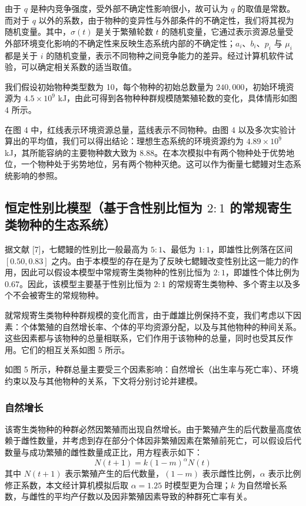 \documentclass[11pt,a4paper]{ctexart}
\begin{document}
由于 $q$ 是种内竞争强度，受外部不确定性影响很小，故可认为 $q$ 的取值是常数。而对于 $q$ 以外的系数，由于物种的变异性与外部条件的不确定性，我们将其视为随机变量。其中，$\sigma(t)$ 是关于繁殖轮数 $t$ 的随机变量，它通过表示资源总量受外部环境变化影响的不确定性来反映生态系统内部的不确定性；$a_{i}$、$b_{i}$、$p_{i}$ 与 $\mu_{i}$ 都是关于 $i$ 的随机变量，表示不同物种之间竞争能力的差异。经过计算机软件试验，可以确定相关系数的适当取值。

我们假设初始物种类型数为 10，每个物种的初始总数量为 $240{,}000$，初始环境资源为 $4.5\times10^{9}$ kJ，由此可得到各物种种群规模随繁殖轮数的变化，具体情形如图 4 所示。

在图 4 中，红线表示环境资源总量，蓝线表示不同物种。由图 4 以及多次实验计算出的平均值，我们可以得出结论：理想生态系统的环境资源约为 $4.89\times10^{9}$ kJ，其所能容纳的主要物种数大致为 8.88。在本次模拟中有两个物种处于优势地位，一个物种处于劣势地位，另有两个物种灭绝。这可以作为衡量七鳃鳗对生态系统影响的参照。

\subsection{恒定性别比模型（基于含性别比恒为 $2:1$ 的常规寄生类物种的生态系统）}

据文献 [7]，七鳃鳗的性别比一般最高为 $5:1$、最低为 $1:1$，即雄性比例落在区间 $[0.50,0.83]$ 之内。由于本模型的存在是为了反映七鳃鳗改变性别比这一能力的作用，因此可以假设本模型中常规寄生类物种的性别比恒为 $2:1$，即雄性个体比例为 0.67。因此，该模型主要基于性别比恒为 $2:1$ 的常规寄生类物种、多个寄主以及多个不会被寄生的常规物种。

就常规寄生类物种种群规模的变化而言，由于雌雄比例保持不变，我们考虑以下因素：个体繁殖的自然增长率、个体的平均资源分配，以及与其他物种的种间关系。这些因素都与该物种的总量相联系，它们作用于该物种的总量，同时也受其反作用。它们的相互关系如图 5 所示。

如图 5 所示，种群总量主要受三个因素影响：自然增长（出生率与死亡率）、环境约束以及与其他物种的关系，下文将分别讨论并建模。

\subsubsection{自然增长}

该寄生类物种的种群必然因繁殖而出现自然增长。由于繁殖产生的后代数量高度依赖于雌性数量，并考虑到存在部分个体因非繁殖因素在繁殖前死亡，可以假设后代数量与成功繁殖的雌性数量成正比，用方程表示如下：
\begin{equation}
N(t+1)=k(1-m)^{\alpha}N(t)
\end{equation}
其中 $N(t+1)$ 表示繁殖产生的后代数量，$(1-m)$ 表示雌性比例，$\alpha$ 表示比例修正系数，本文经计算机模拟后取 $\alpha=1.25$ 时模型更为合理；$k$ 为自然增长系数，与雌性的平均产仔数以及因非繁殖因素导致的种群死亡率有关。
\end{document}
